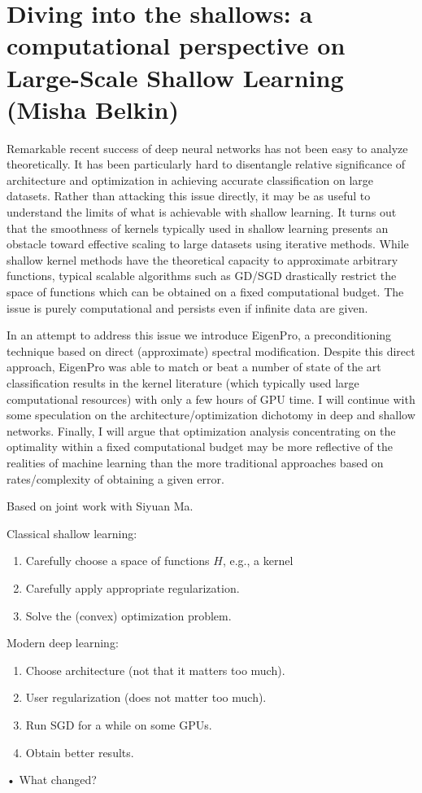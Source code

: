 \section{Diving into the shallows: a computational perspective on Large-Scale Shallow Learning (Misha Belkin)}

Remarkable recent success of deep neural networks has not been easy to analyze theoretically. It has been  particularly hard to disentangle relative significance of architecture and optimization in achieving accurate classification on large datasets. Rather than attacking this issue directly,  it  may be as useful to understand the limits of what is achievable with shallow learning. It turns out that the smoothness of  kernels typically  used in shallow learning presents an obstacle toward effective scaling to large datasets using  iterative methods. While shallow kernel methods have the theoretical capacity to approximate arbitrary functions, typical scalable algorithms such as GD/SGD drastically restrict the space of functions which can be obtained on a fixed computational budget. The issue is purely computational and persists even if infinite data are given.

In an attempt to address this issue we introduce  EigenPro, a preconditioning technique based on direct (approximate) spectral modification. Despite this direct  approach, EigenPro was able to match or beat a number of state of the art classification results in the kernel literature (which typically used large computational resources) with only a few hours of GPU time. I will continue with some speculation on the architecture/optimization dichotomy in deep and shallow networks. Finally,  I will argue that optimization analysis concentrating on the optimality within a fixed computational budget may be more reflective of  the realities of machine learning than the more traditional approaches based on rates/complexity of obtaining a given error.

Based on joint work with Siyuan Ma.

Classical shallow learning:
\begin{enumerate}
\item
Carefully choose a space of functions $H$, e.g., a kernel
\item
Carefully apply appropriate regularization.
\item
Solve the (convex) optimization problem.
\end{enumerate}
Modern deep learning:
\begin{enumerate}
\item
Choose architecture (not that it matters too much).
\item
User regularization (does not matter too much).
\item
Run SGD for a while on some GPUs.
\item
Obtain better results.
\end{enumerate}•
What changed?


